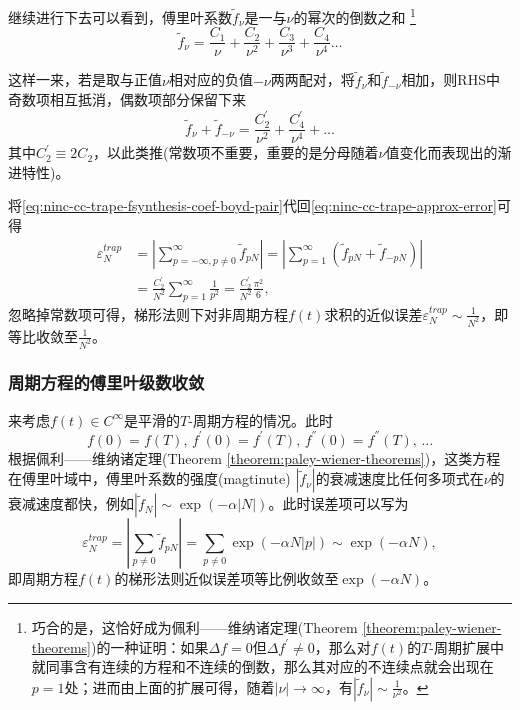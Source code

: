 继续进行下去可以看到，傅里叶系数$\tilde{f}_{\nu}$是一与$\nu$的幂次的倒数之和
\footnote{巧合的是，这恰好成为佩利——维纳诸定理(Theorem \ref{theorem:paley-wiener-theorems})的一种证明：如果$\Delta f=0$但$\Delta f^{'} \neq 0$，那么对$f(t)$的$T$-周期扩展中就同事含有连续的方程和不连续的倒数，那么其对应的不连续点就会出现在$p=1$处；进而由上面的扩展可得，随着$\left| \nu \right| \rightarrow \infty$，有$\left| \tilde{f}_{\nu} \right| \sim \frac{1}{\nu^{2}}$。
}
\begin{equation}
  \label{eq:ninc-cc-trape-fsynthesis-coef-boyd}
  \tilde{f}_{\nu} = \frac{C_{1}}{\nu}
  + \frac{C_{2}}{\nu^{2}}
  + \frac{C_{3}}{\nu^{3}}
  + \frac{C_{4}}{\nu^{4}} \ldots
\end{equation}

这样一来，若是取与正值$\nu$相对应的负值$- \nu$两两配对，将$\tilde{f}_{\nu}$和$\tilde{f}_{- \nu}$相加，则RHS中奇数项相互抵消，偶数项部分保留下来
\begin{equation}
  \label{eq:ninc-cc-trape-fsynthesis-coef-boyd-pair}
  \tilde{f}_{\nu} + \tilde{f}_{- \nu} =
  \frac{C^{'}_{2}}{\nu^{2}} + \frac{C^{'}_{4}}{\nu^{4}} + \ldots
\end{equation}
其中$C^{'}_{2} \equiv 2 C_{2}$，以此类推(常数项不重要，重要的是分母随着$\nu$值变化而表现出的渐进特性)。

将\eqref{eq:ninc-cc-trape-fsynthesis-coef-boyd-pair}代回\eqref{eq:ninc-cc-trape-approx-error}可得
\begin{equation*}
\begin{split}
    \varepsilon_{N}^{trap} & =  \left| \sum_{p = -\infty, p \neq 0}^{\infty} \tilde{f}_{p N} \right| =
    \left| \sum_{p = 1}^{\infty} \left( \tilde{f}_{p N} + \tilde{f}_{- p N} \right) \right| \\
    & = \frac{C^{'}_{2}}{N^{2}} \sum_{p=1}^{\infty} \frac{1}{p^{2}} = \frac{C^{'}_{2}}{N^{2}} \frac{\pi^{2}}{6},
\end{split}
\end{equation*}
忽略掉常数项可得，梯形法则下对非周期方程$f(t)$求积的近似误差$\varepsilon_{N}^{trap} \sim \frac{1}{N^{2}}$，即等比收敛至$\frac{1}{N^{2}}$。

\subsubsection{周期方程的傅里叶级数收敛}
来考虑$f(t) \in C^{\infty}$是平滑的$T$-周期方程的情况。此时
\begin{equation*}
  f(0) = f(T), \, f^{'}(0)=f^{'}(T), \, f^{''}(0)=f^{''}(T), \, \ldots
\end{equation*}
根据佩利——维纳诸定理(Theorem \ref{theorem:paley-wiener-theorems})，这类方程在傅里叶域中，傅里叶系数的强度(magtinute) $\left| \tilde{f}_{\nu} \right|$的衰减速度比任何多项式在$\nu$的衰减速度都快，例如$\left| \tilde{f}_{N} \right| \sim \exp \left( - \alpha \left| N \right| \right)$。此时误差项可以写为
\begin{equation*}
  \varepsilon_{N}^{trap} =
  \left|
  \sum_{p \neq 0} \tilde{f}_{p N}
  \right| =
  \sum_{p \neq 0 } \exp \left( - \alpha N \left| p \right| \right) \sim \exp \left( - \alpha N \right),
\end{equation*}
即周期方程$f(t)$的梯形法则近似误差项等比例收敛至$\exp \left( - \alpha N \right)$。

